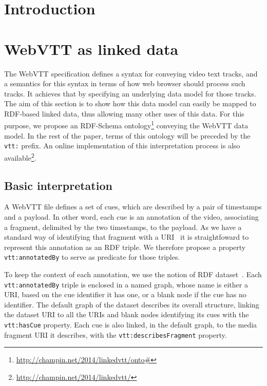 \documentclass{sig-alternate}
\newcommand{\inlinelistingsize}{\fontsize{8pt}{11pt}}
\let\oldurl\url
\renewcommand{\url}[1]{\inlinelistingsize\oldurl{#1}}
\newcommand{\vtt}[1]{\texttt{vtt:#1}}
\begin{document}



\section{Introduction}

\cite{pfeiffer2013webvtt}

\section{WebVTT as linked data}

The WebVTT specification defines a syntax for conveying video text tracks,
and a semantics for this syntax in terms of how web browser should process such tracks.
It achieves that by specifying an underlying data model for those tracks.
The aim of this section is to show
how this data model can easily be mapped to RDF-based linked data,
thus allowing many other uses of this data.
For this purpose, we propose an RDF-Schema ontology\footnote{
  \url{http://champin.net/2014/linkedvtt/onto\#}
} conveying the WebVTT data model.
In the rest of the paper, terms of this ontology will be preceded by the \vtt{} prefix.
An online implementation of this interpretation process is also available\footnote{
  \url{http://champin.net/2014/linkedvtt/}
}.

\subsection{Basic interpretation}

A WebVTT file defines a set of cues,
which are described by a pair of timestamps and a payload.
In other word, each cue is an annotation of the video,
associating a fragment, delimited by the two timestamps, to the payload.
As we have a standard way of identifying that fragment with a URI~\cite{troncy2012mediafragments}
it is straightfoward to represent this annotation as an RDF triple.
We therefore propose a property \vtt{annotatedBy} to serve as predicate for those triples.

To keep the context of each annotation,
we use the notion of RDF dataset~\cite{cyganiak2014rdf11concepts}.
Each \vtt{annotatedBy} triple is enclosed in a named graph,
whose name is either a URI, based on the cue identifier it has one,
or a blank node if the cue has no identifier.
The default graph of the dataset describes its overall structure,
linking the dataset URI to all the URIs and blank nodes identifying its cues
with the \vtt{hasCue} property.
Each cue is also linked, in the default graph, to the media fragment URI it describes,
with the \vtt{describesFragment} property. 
\end{document}
